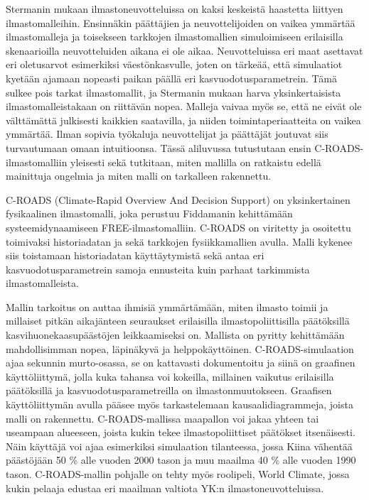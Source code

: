 \documentclass[finnish,12pt,a4paper,pdftex]{article}
\begin{document}
\begin{onehalfspacing}
Stermanin \cite{CroadsFlightSimulator2011} mukaan ilmastoneuvotteluissa on kaksi keskeistä haastetta liittyen ilmastomalleihin. Ensinnäkin päättäjien ja neuvottelijoiden on vaikea ymmärtää ilmastomalleja ja toisekseen tarkkojen ilmastomallien simuloimiseen erilaisilla skenaarioilla neuvotteluiden aikana ei ole aikaa. Neuvotteluissa eri maat asettavat eri oletusarvot esimerkiksi väestönkasvulle, joten on tärkeää, että simulaatiot kyetään ajamaan nopeasti paikan päällä eri kasvuodotusparametrein. Tämä sulkee pois tarkat ilmastomallit, ja Stermanin \cite{CroadsFlightSimulator2011} mukaan harva yksinkertaisista ilmastomalleistakaan on riittävän nopea. Malleja vaivaa myös se, että ne eivät ole välttämättä julkisesti kaikkien saatavilla, ja niiden toimintaperiaatteita on vaikea ymmärtää. Ilman sopivia työkaluja neuvottelijat ja päättäjät joutuvat siis turvautumaan omaan intuitioonsa. Tässä aliluvussa tutustutaan ensin C-ROADS-ilmastomalliin yleisesti sekä tutkitaan, miten mallilla on ratkaistu edellä mainittuja ongelmia ja miten malli on tarkalleen rakennettu.

C-ROADS (Climate-Rapid Overview And Decision Support) on yksinkertainen fysikaalinen ilmastomalli, joka perustuu Fiddamanin \cite{Fiddaman1997} kehittämään systeemidynaamiseen FREE-ilmastomalliin. C-ROADS on viritetty ja osoitettu toimivaksi historiadatan ja sekä tarkkojen fysiikkamallien avulla. Malli kykenee siis toistamaan historiadatan käyttäytymistä sekä antaa eri kasvuodotusparametrein samoja ennusteita kuin parhaat tarkimmista ilmastomalleista. \cite{CroadsWWW, CroadsFlightSimulator2011} 

Mallin tarkoitus on auttaa ihmisiä ymmärtämään, miten ilmasto toimii ja millaiset pitkän aikajänteen seuraukset erilaisilla ilmastopoliittisilla päätöksillä kasvihuonekaasupäästöjen leikkaamiseksi on. Mallista on pyritty kehittämään mahdollisimman nopea, läpinäkyvä ja helppokäyttöinen. C-ROADS-simulaation ajaa sekunnin murto-osassa, se on kattavasti dokumentoitu ja siinä on graafinen käyttöliittymä, jolla kuka tahansa voi kokeilla, millainen vaikutus erilaisilla päätöksillä ja kasvuodotusparametreilla on ilmastonmuutokseen. Graafisen käyttöliittymän avulla pääsee myös tarkastelemaan kausaalidiagrammeja, joista malli on rakennettu. C-ROADS-mallissa maapallon voi jakaa yhteen tai useampaan alueeseen, joista kukin tekee ilmastopoliittiset päätökset itsenäisesti. Näin käyttäjä voi ajaa esimerkiksi simulaation tilanteessa, jossa Kiina vähentää päästöjään 50 \% alle vuoden 2000 tason ja muu maailma 40 \% alle vuoden 1990 tason. C-ROADS-mallin pohjalle on tehty myös roolipeli, World Climate, jossa kukin pelaaja edustaa eri maailman valtiota YK:n ilmastoneuvotteluissa. \cite{Croads, CroadsWWW, CroadsFlightSimulator2011} 


\end{onehalfspacing}
\end{document}
